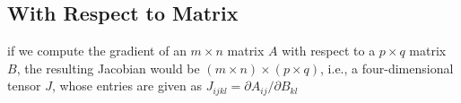 \subsection{With Respect to Matrix}
if we compute the gradient of an $m \times  n$ matrix $A$ with respect to a $p \times  q$ matrix $B$, the resulting Jacobian would be $(m\times n)\times (p\times q)$, i.e., a four-dimensional tensor $J$, whose entries are given as $J_{ijkl} = \partial A_{ij}/\partial B_{kl}$


























